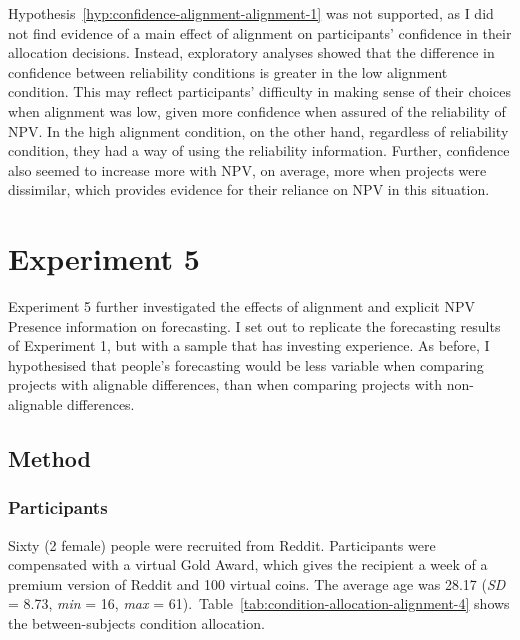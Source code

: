 \documentclass[a4paper, nobind, dvipsnames]{templates/ociamthesis}
\theoremstyle{definition}
\theoremstyle{definition}
\theoremstyle{definition}
\theoremstyle{definition}
\theoremstyle{remark}
\begin{document}
Hypothesis~\ref{hyp:confidence-alignment-alignment-1} was not supported, as I
did not find evidence of a main effect of alignment on participants' confidence
in their allocation decisions. Instead, exploratory analyses showed that the
difference in confidence between reliability conditions is greater in the low
alignment condition. This may reflect participants' difficulty in making sense
of their choices when alignment was low, given more confidence when assured of
the reliability of NPV. In the high alignment condition, on the other hand,
regardless of reliability condition, they had a way of using the reliability
information. Further, confidence also seemed to increase more with NPV, on
average, more when projects were dissimilar, which provides evidence for their
reliance on NPV in this situation.

\hypertarget{alignment-4}{%
\section{Experiment 5}\label{alignment-4}}

Experiment 5 further investigated the effects of alignment and explicit NPV
Presence information on forecasting. I set out to replicate the forecasting
results of Experiment 1, but with a sample that has investing experience. As
before, I hypothesised that people's forecasting would be less variable when
comparing projects with alignable differences, than when comparing projects with
non-alignable differences.

\subsection{Method}

\subsubsection{Participants}

Sixty (2 female) people were recruited from Reddit. Participants were compensated with a virtual Gold Award, which gives the recipient a week of a premium version of Reddit and 100 virtual coins. The average age was 28.17 (\emph{SD} = 8.73, \emph{min} = 16, \emph{max} = 61).~Table~\ref{tab:condition-allocation-alignment-4}
shows the between-subjects condition allocation.
\end{document}
